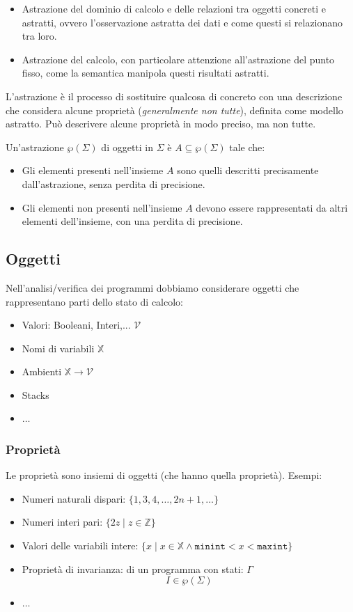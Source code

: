 \begin{itemize}
  \item Astrazione del dominio di calcolo e delle relazioni tra oggetti concreti e astratti, ovvero 
  l'osservazione astratta dei dati e come questi si relazionano tra loro.
  \item Astrazione del calcolo, con particolare attenzione all'astrazione del punto fisso, come la 
  semantica manipola questi risultati astratti.
\end{itemize}
L'astrazione è il processo di sostituire qualcosa di concreto con una descrizione che considera alcune proprietà
(\textit{generalmente non tutte}), definita come modello astratto.
Può descrivere alcune proprietà in modo preciso, ma non tutte.

Un'astrazione $\wp(\Sigma)$ di oggetti in $\Sigma$ è $A \subseteq \wp(\Sigma)$ tale che:
\begin{itemize}
    \item Gli elementi presenti nell'insieme $A$ sono quelli descritti precisamente
    dall'astrazione, senza perdita di precisione.
    \item Gli elementi non presenti nell'insieme $A$ devono essere rappresentati da
    altri elementi dell'insieme, con una perdita di precisione.
\end{itemize}
\subsection{Oggetti}
Nell'analisi/verifica dei programmi dobbiamo considerare oggetti che rappresentano parti dello stato di calcolo:
\begin{itemize}
    \item Valori: Booleani, Interi,... $\mathcal{V}$
    \item Nomi di variabili $\mathbb{X}$
    \item Ambienti $\mathbb{X} \rightarrow \mathcal{V}$
    \item Stacks
    \item $\ldots$
\end{itemize}
\subsubsection{Proprietà}
Le proprietà sono insiemi di oggetti (che hanno quella proprietà). Esempi:
\begin{itemize}
    \item Numeri naturali dispari: $\{1, 3, 4, \dots, 2n + 1, \dots\}$
    \item Numeri interi pari: $\{2z \mid z \in \mathbb{Z}\}$
    \item Valori delle variabili intere: $\{x \mid x \in \mathbb{X} \land \texttt{minint} < x < \texttt{maxint}\}$
    \item Proprietà di invarianza: di un programma con stati: $\Gamma$
    \[
      I \in \wp(\Sigma)
    \]
    \item $\ldots$
\end{itemize}
